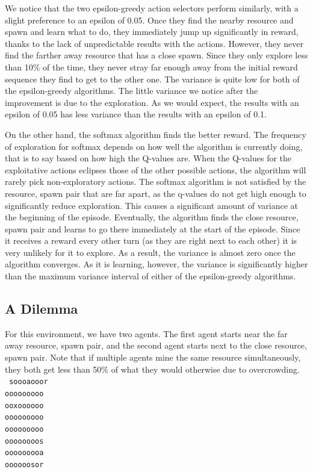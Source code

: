 \documentclass[11pt]{article}
\begin{document}
We notice that the two epsilon-greedy action selectors perform similarly, with a slight preference to an epsilon of 0.05. Once they find the nearby resource and spawn and learn what to do, they immediately jump up significantly in reward, thanks to the lack of unpredictable results with the actions. However, they never find the farther away resource that has a close spawn. Since they only explore less than 10\% of the time, they never stray far enough away from the initial reward sequence they find to get to the other one. The variance is quite low for both of the epsilon-greedy algorithms. The little variance we notice after the improvement is due to the exploration. As we would expect, the results with an epsilon of 0.05 has less variance than the results with an epsilon of 0.1.

On the other hand, the softmax algorithm finds the better reward. The frequency of exploration for softmax depends on how well the algorithm is currently doing, that is to say based on how high the Q-values are. When the Q-values for the exploitative actions eclipses those of the other possible actions, the algorithm will rarely pick non-exploratory actions. The softmax algorithm is not satisfied by the resource, spawn pair that are far apart, as the q-values do not get high enough to significantly reduce exploration. This causes a significant amount of variance at the beginning of the episode. Eventually, the algorithm finds the close resource, spawn pair and learns to go there immediately at the start of the episode. Since it receives a reward every other turn (as they are right next to each other) it is very unlikely for it to explore. As a result, the variance is almost zero once the algorithm converges. As it is learning, however, the variance is significantly higher than the maximum variance interval of either of the epsilon-greedy algorithms.

\subsection{A Dilemma}

For this environment, we have two agents. The first agent starts near the far away resource, spawn pair, and the second agent starts next to the close resource, spawn pair. Note that if multiple agents mine the same resource simultaneously, they both get less than 50\% of what they would otherwise due to overcrowding.\\
\texttt{
soooaooor\\
ooooooooo\\
ooxoooooo\\
ooooooooo\\
ooooooooo\\
oooooooos\\
ooooooooa\\
oooooosor\\
}
\end{document}
